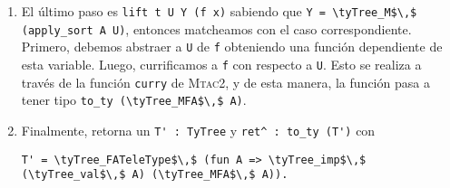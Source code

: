 \begin{enumerate}
    Esto nos es útil porque ahora podemos generar un valor \lstinline{x : X'}en \lift, donde \lstinline{X'} es \lstinline{MTele_val (MTele_In \Type_sort F)}.
    Es decir que \lstinline{x} es una variable del tipo resultante de liftear \lstinline{X}, el lado izquierdo de la implicación. Lo que resta es tomar nuestra función \lstinline{f} de tipo \lstinline{X'-> Y} y liftearla. Esto signfica liftear \lstinline{f x}.
    \item El último paso es \lstinline{lift t U Y (f x)} sabiendo que \lstinline{Y = \tyTree_M$\,$ (apply_sort A U)}, entonces matcheamos con el caso correspondiente. Primero, debemos abstraer a \lstinline{U} de \lstinline{f} obteniendo una función dependiente de esta variable.
    Luego, currificamos a \lstinline{f} con respecto a \lstinline{U}. Esto se realiza a través de la función \lstinline{curry} de \textsc{Mtac2}, y de esta manera, la función pasa a tener tipo \lstinline{to_ty (\tyTree_MFA$\,$ A)}.
    \item Finalmente, \lift retorna un \lstinline{T' : TyTree} y \lstinline{ret^ : to_ty (T')} con
    \begin{lstlisting}
T' = \tyTree_FATeleType$\,$ (fun A => \tyTree_imp$\,$ (\tyTree_val$\,$ A) (\tyTree_MFA$\,$ A)).
    \end{lstlisting}
\end{enumerate}